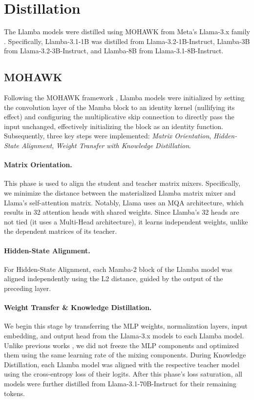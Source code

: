 \section{Distillation}
\label{sec:distillation}


The Llamba models were distilled using MOHAWK \citep{mohawk} from Meta’s Llama-3.x family \citep{llama}. Specifically, Llamba-3.1-1B was distilled from Llama-3.2-1B-Instruct, Llamba-3B from Llama-3.2-3B-Instruct, and Llamba-8B from Llama-3.1-8B-Instruct.


\subsection{MOHAWK}
\label{subsec:mohawk}

Following the MOHAWK framework \citep{mohawk}, Llamba models were initialized by setting the convolution layer of the Mamba block to an identity kernel (nullifying its effect) and configuring the multiplicative skip connection to directly pass the input unchanged, effectively initializing the block as an identity function.
Subsequently, three key steps were implemented: \textit{Matrix Orientation}, \textit{Hidden-State Alignment}, \textit{Weight Transfer with Knowledge Distillation}.


\paragraph{Matrix Orientation.}
This phase is used to align the student and teacher matrix mixers. Specifically, we minimize the distance between the materialized Llamba matrix mixer and Llama’s self-attention matrix. Notably, Llama uses an MQA architecture, which results in 32 attention heads with shared weights. Since Llamba’s 32 heads are not tied (it uses a Multi-Head architecture), it learns independent weights, unlike the dependent matrices of its teacher.

\paragraph{Hidden-State Alignment.}
For Hidden-State Alignment, each Mamba-2 block of the Llamba model was aligned independently using the L2 distance, guided by the output of the preceding layer.

\paragraph{Weight Transfer \& Knowledge Distillation.}
We begin this stage by transferring the MLP weights, normalization layers, input embedding, and output head from the Llama-3.x models to each Llamba model.
Unlike previous works \citep{wang2024mamballamadistillingaccelerating,mohawk}, we did not freeze the MLP components and optimized them using the same learning rate of the mixing components.
During Knowledge Distillation, each Llamba model was aligned with the respective teacher model using the cross-entropy loss of their logits. After this phase's loss saturation, all models were further distilled from Llama-3.1-70B-Instruct for their remaining tokens.

